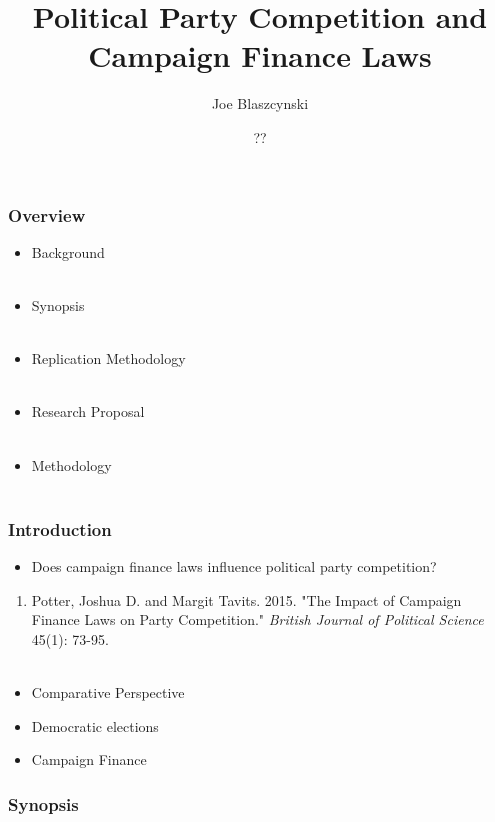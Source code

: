 \documentclass{beamer}
\begin{document}

\title{Political Party Competition and Campaign Finance Laws}
\author{\author{Joe Blaszcynski}}
\begin{frame}
\titlepage
\date{??}
\end{frame}


\begin{frame}
\frametitle{Overview}
\begin{itemize} 
\item{Background} \\~\
\item{Synopsis} \\~\
\item{Replication Methodology} \\~\
\item{Research Proposal} \\~\  
\item{Methodology} \\~\ 
\end{itemize}
\end{frame}


\begin{frame}
\frametitle{Introduction} 
\begin{itemize}
\item{Does campaign finance laws influence political party competition?} 
\end{itemize}
	\begin{enumerate}[i]
	\item{Potter, Joshua D. and Margit Tavits. 2015. "The Impact of Campaign Finance Laws on Party Competition." \emph{British Journal of Political Science} 45(1): 73-95.} \\~\
\end{enumerate}
\begin{itemize}
	\item{Comparative Perspective} 
	\item{Democratic elections}
	\item{Campaign Finance}
\end{itemize}
\end{frame}


\begin{frame} 
\frametitle{Synopsis}
\begin{itemize}
	\item{%
\end{itemize}
\end{frame}
\end{document}
